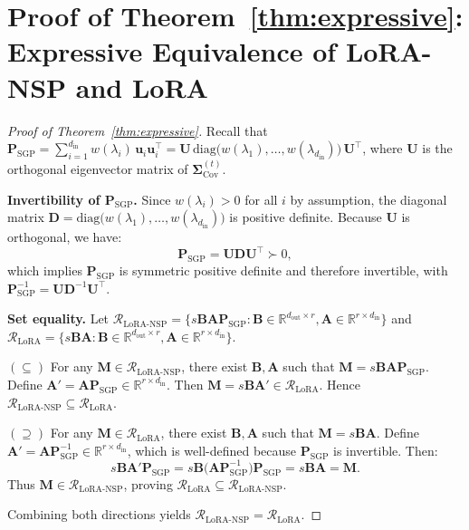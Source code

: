 \documentclass{article}
\begin{document}
\section{Proof of Theorem~\ref{thm:expressive}: Expressive Equivalence of LoRA-NSP and LoRA}
\label{app:thm2}

\begin{proof}[Proof of Theorem~\ref{thm:expressive}]
Recall that $\mathbf{P}_{\text{SGP}} = \sum_{i=1}^{d_{\text{in}}} w(\lambda_i) \, \mathbf{u}_i \mathbf{u}_i^\top = \mathbf{U} \, \mathrm{diag}\big(w(\lambda_1), \ldots, w(\lambda_{d_{\text{in}}})\big) \, \mathbf{U}^\top$, where $\mathbf{U}$ is the orthogonal eigenvector matrix of $\mathbf{\Sigma}_{\text{Cov}}^{(t)}$.

\textbf{Invertibility of $\mathbf{P}_{\text{SGP}}$.} Since $w(\lambda_i) > 0$ for all $i$ by assumption, the diagonal matrix $\mathbf{D} = \mathrm{diag}\big(w(\lambda_1), \ldots, w(\lambda_{d_{\text{in}}})\big)$ is positive definite. Because $\mathbf{U}$ is orthogonal, we have:
\begin{equation}
    \mathbf{P}_{\text{SGP}} = \mathbf{U}\mathbf{D}\mathbf{U}^\top \succ 0,
\end{equation}
which implies $\mathbf{P}_{\text{SGP}}$ is symmetric positive definite and therefore invertible, with $\mathbf{P}_{\text{SGP}}^{-1} = \mathbf{U}\mathbf{D}^{-1}\mathbf{U}^\top$.

\textbf{Set equality.} Let $\mathcal{R}_{\text{LoRA-NSP}} = \{s\mathbf{B}\mathbf{A}\mathbf{P}_{\text{SGP}} : \mathbf{B} \in \mathbb{R}^{d_{\text{out}} \times r}, \mathbf{A} \in \mathbb{R}^{r \times d_{\text{in}}}\}$ and $\mathcal{R}_{\text{LoRA}} = \{s\mathbf{B}\mathbf{A} : \mathbf{B} \in \mathbb{R}^{d_{\text{out}} \times r}, \mathbf{A} \in \mathbb{R}^{r \times d_{\text{in}}}\}$.

$(\subseteq)$ For any $\mathbf{M} \in \mathcal{R}_{\text{LoRA-NSP}}$, there exist $\mathbf{B}, \mathbf{A}$ such that $\mathbf{M} = s\mathbf{B}\mathbf{A}\mathbf{P}_{\text{SGP}}$. Define $\mathbf{A}' = \mathbf{A}\mathbf{P}_{\text{SGP}} \in \mathbb{R}^{r \times d_{\text{in}}}$. Then $\mathbf{M} = s\mathbf{B}\mathbf{A}' \in \mathcal{R}_{\text{LoRA}}$. Hence $\mathcal{R}_{\text{LoRA-NSP}} \subseteq \mathcal{R}_{\text{LoRA}}$.

$(\supseteq)$ For any $\mathbf{M} \in \mathcal{R}_{\text{LoRA}}$, there exist $\mathbf{B}, \mathbf{A}$ such that $\mathbf{M} = s\mathbf{B}\mathbf{A}$. Define $\mathbf{A}' = \mathbf{A}\mathbf{P}_{\text{SGP}}^{-1} \in \mathbb{R}^{r \times d_{\text{in}}}$, which is well-defined because $\mathbf{P}_{\text{SGP}}$ is invertible. Then:
\begin{equation}
    s\mathbf{B}\mathbf{A}'\mathbf{P}_{\text{SGP}} = s\mathbf{B}\big(\mathbf{A}\mathbf{P}_{\text{SGP}}^{-1}\big)\mathbf{P}_{\text{SGP}} = s\mathbf{B}\mathbf{A} = \mathbf{M}.
\end{equation}
Thus $\mathbf{M} \in \mathcal{R}_{\text{LoRA-NSP}}$, proving $\mathcal{R}_{\text{LoRA}} \subseteq \mathcal{R}_{\text{LoRA-NSP}}$.

Combining both directions yields $\mathcal{R}_{\text{LoRA-NSP}} = \mathcal{R}_{\text{LoRA}}$.
\end{proof}
\end{document}
